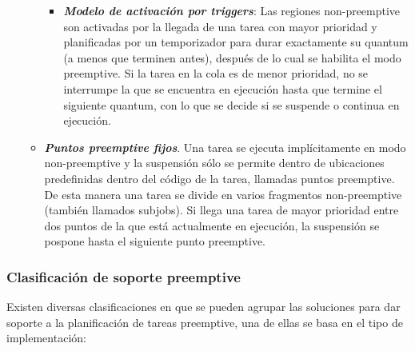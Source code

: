 \begin{itemize}
\begin{itemize}
\begin{itemize}
        \item \textbf{\textit{Modelo de activación por \gls{triggers}}}: Las regiones \gls{non-preemptive} son activadas por la llegada de una tarea con mayor prioridad y planificadas por un temporizador para durar exactamente su \gls{quantum} (a menos que terminen antes), después de lo cual se habilita el modo \gls{preemptive}. Si la tarea en la cola es de menor prioridad, no se interrumpe la que se encuentra en ejecución hasta que termine el siguiente \gls{quantum}, con lo que se decide si se suspende o continua en ejecución.
        \end{itemize}
    \item \textbf{\textit{Puntos \gls{preemptive} fijos}}. Una tarea se ejecuta implícitamente en modo \gls{non-preemptive} y la suspensión sólo se permite dentro de ubicaciones predefinidas dentro del código de la tarea, llamadas puntos \gls{preemptive}. De esta manera una tarea se divide en varios fragmentos \gls{non-preemptive} (también llamados subjobs). Si llega una tarea de mayor prioridad entre dos puntos de la que está actualmente en ejecución, la suspensión se pospone hasta el siguiente punto \gls{preemptive}. 
    \end{itemize}
\end{itemize}


\subsubsection{Clasificación de soporte preemptive}

\label{claspree}
Existen diversas clasificaciones en que se pueden agrupar las soluciones para dar soporte a la planificación de tareas \gls{preemptive}, una de ellas se basa en el tipo de implementación:

